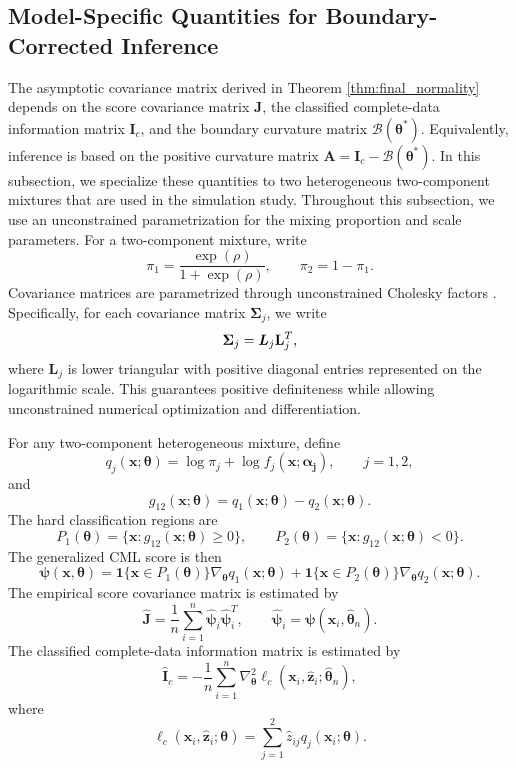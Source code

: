 \documentclass[pdflatex,sn-mathphys-ay]{sn-jnl}%
\let\oldtheta\theta
\renewcommand{\theta}{\boldsymbol{\oldtheta}}
\let\oldalpha\alpha
\renewcommand{\alpha}{\boldsymbol{\oldalpha}}
\let\oldSigma\Sigma
\renewcommand{\Sigma}{\boldsymbol{\oldSigma}}
\theoremstyle{thmstyleone}%
\theoremstyle{thmstyletwo}%
\theoremstyle{thmstylethree}%
\begin{document}
\subsection{Model-Specific Quantities for Boundary-Corrected Inference}
\label{subsec:model_specific_quantities}

The asymptotic covariance matrix derived in Theorem
\ref{thm:final_normality} depends on the score covariance matrix $\mathbf{J}$, the
classified complete-data information matrix $\mathbf{I}_c$, and the boundary
curvature matrix $\mathcal{B}(\boldsymbol{\theta}^*)$. Equivalently, inference is based on the positive curvature matrix
$\mathbf{A}=\mathbf{I}_c-\mathcal{B}(\boldsymbol{\theta}^*)$. In this subsection, we specialize
these quantities to two heterogeneous two-component mixtures that are used
in the simulation study. Throughout this subsection, we use an unconstrained
parametrization for the mixing proportion and scale parameters. For a
two-component mixture, write
\[
    \pi_1 = \frac{\exp(\rho)}{1+\exp(\rho)},
    \qquad
    \pi_2 = 1-\pi_1.
\]
Covariance matrices are parametrized through unconstrained Cholesky factors \citep{golub2013matrix}.
Specifically, for each covariance matrix $\Sigma_j$, we write
\[
    \boldsymbol{\Sigma}_j = \boldsymbol{L}_j\bold{L}_j^T,
\]
where $\mathbf{L}_j$ is lower triangular with positive diagonal entries represented on the logarithmic scale. This guarantees positive definiteness while allowing unconstrained numerical optimization and differentiation.

For any two-component heterogeneous mixture, define
\[
    q_j(\mathbf{x};\boldsymbol{\theta})
    =
    \log \pi_j + \log f_j(\mathbf{x};\boldsymbol{\alpha_j}),
    \qquad j=1,2,
\]
and
\[
    g_{12}(\mathbf{x};\boldsymbol{\theta})
    =
    q_1(\mathbf{x};\boldsymbol{\theta})-q_2(\mathbf{x};\boldsymbol{\theta}).
\]
The hard classification regions are
\[
    P_1(\boldsymbol{\theta})
    =
    \{\mathbf{x}:g_{12}(\mathbf{x};\boldsymbol{\theta})\geq 0\},
    \qquad
    P_2(\boldsymbol{\theta})
    =
    \{\mathbf{x}:g_{12}(\mathbf{x};\boldsymbol{\theta})<0\}.
\]
The generalized CML score is then
\[
    \boldsymbol{\psi}(\mathbf{x},\boldsymbol{\theta})
    =
    \mathbf{1}\{\mathbf{x}\in P_1(\boldsymbol{\theta})\}\nabla_{\boldsymbol{\theta}} q_1(\mathbf{x};\boldsymbol{\theta})
    +
    \mathbf{1}\{\mathbf{x}\in P_2(\boldsymbol{\theta})\}\nabla_{\boldsymbol{\theta}} q_2(\mathbf{x};\boldsymbol{\theta}).
\]
The empirical score covariance matrix is estimated by
\[
    \widehat{\mathbf{J}}
    =
    \frac{1}{n}
    \sum_{i=1}^n
    \widehat{\boldsymbol{\psi}}_i
    \widehat{\boldsymbol{\psi}}_i^T,
    \qquad
    \widehat{\boldsymbol{\psi}}_i
    =
    \boldsymbol{\psi}
    (\mathbf{x}_i,\widehat{\boldsymbol{\theta}}_n).
\]
The classified complete-data information matrix is estimated by
\[
    \widehat{\mathbf{I}}_c
    =
    -
    \frac{1}{n}
    \sum_{i=1}^n
    \nabla_{\theta}^2
    \ell_c(\mathbf{x}_i,\widehat{\mathbf{z}}_i; \widehat {\boldsymbol{\theta}}_n),
\]
where
\[
    \ell_c(\mathbf{x}_i,\widehat{\mathbf{z}}_i;\boldsymbol{\theta})
    =
    \sum_{j=1}^2
    \widehat z_{ij}
    q_j(\mathbf{x}_i;\boldsymbol{\theta}).
\]
\end{document}
